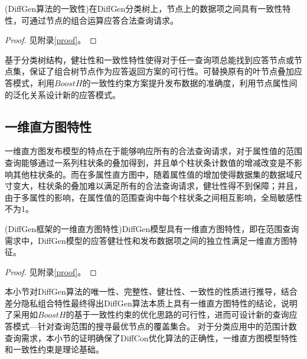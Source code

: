 \begin{prop}
	\label{chap4_prop4}
	(DiffGen算法的一致性)在DiffGen分类树上，节点上的数据项之间具有一致性特性，可通过节点的组合运算应答合法查询请求。
\end{prop}
\begin{proof}
	见附录\ref{proof}。
\end{proof}

基于分类树结构，健壮性和一致性特性使得对于任一查询项总能找到应答节点或节点集，保证了组合树节点作为应答返回方案的可行性。可替换原有的叶节点叠加应答模式，利用$BoostH$的一致性约束方案提升发布数据的准确度，利用节点属性间的泛化关系设计新的应答模式。


\subsection{一维直方图特性} %


一维直方图发布模型的特点在于能够响应所有的合法查询请求，对于属性值的范围查询能够通过一系列柱状条的叠加得到，并且单个柱状条计数值的增减改变是不影响其他柱状条的。而在多属性直方图中，随着属性值的增加使得数据集的数据域尺寸变大，柱状条的叠加难以满足所有的合法查询请求，健壮性得不到保障；并且，由于多属性的影响，在属性值的范围查询中每个柱状条之间相互影响，全局敏感性不为1。

\begin{prop}
	\label{chap4_prop5}
	(DiffGen框架的一维直方图特性)DiffGen模型具有一维直方图特性，即在范围查询需求中，DiffGen模型的应答健壮性和发布数据项之间的独立性满足一维直方图特征。
\end{prop}
\begin{proof}
	见附录\ref{proof}。
\end{proof}

本小节对DiffGen算法的唯一性、完整性、健壮性、一致性的性质进行推导，结合差分隐私组合特性最终得出DiffGen算法本质上具有一维直方图特性的结论，说明了采用如$BoostH$的基于一致性约束的优化思路的可行性，进而可设计新的查询应答模式---针对查询范围的搜寻最优节点的覆盖集合。
对于分类应用中的范围计数查询需求，本小节的证明确保了DiffCon优化算法的正确性，一维直方图模型特性和一致性约束是理论基础。


